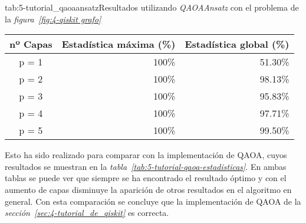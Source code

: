 \begin{table}[htbp]{tab:5-tutorial_qaoaansatz}{Resultados utilizando \textit{QAOAAnsatz} con el problema de la \textit{figura~\ref{fig:4-qiskit grafo}}}
  \begin{tabular}{|c|r|r|}
    \hline
    \textbf{nº Capas} & \textbf{Estadística máxima (\%)} & \textbf{Estadística global (\%)} \\ \hline
    p = 1             & 100\%                            & 51.30\%                          \\ \hline
    p = 2             & 100\%                            & 98.13\%                          \\ \hline
    p = 3             & 100\%                            & 95.83\%                          \\ \hline
    p = 4             & 100\%                            & 97.71\%                          \\ \hline
    p = 5             & 100\%                            & 99.50\%                          \\ \hline
  \end{tabular}
\end{table}

Esto ha sido realizado para comparar con la implementación de QAOA, cuyos resultados se muestran en la \textit{tabla~\ref{tab:5-tutorial-qaoa-estadisticas}}. En ambas tablas se puede ver que siempre se ha encontrado el resultado óptimo y con el aumento de capas disminuye la aparición de otros resultados en el algoritmo en general. Con esta comparación se concluye que la implementación de QAOA de la \textit{sección~\ref{sec:4-tutorial_de_qiskit}} es correcta.


